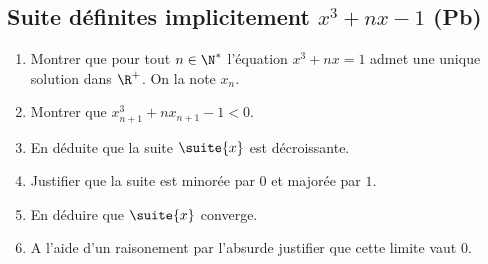 
\subsection{ Suite définites implicitement $x^3+nx-1$ (Pb) }


\begin{exercice}
\begin{enumerate}
\item Montrer que pour tout $n\in \N^*$ l'équation $x^3+nx=1$ admet une unique solution dans $\R^+$. On la note $x_n$. 
\item Montrer que $x_{n+1}^3+n x_{n+1}-1<0$.
\item En déduite que la suite $\suite{x} $ est décroissante. 
\item Justifier que la suite est minorée par $0$ et majorée par $1$. 
\item En déduire que $\suite{x}$ converge. 
\item A l'aide d'un raisonement par l'absurde justifier que cette limite vaut $0$. 
\end{enumerate}
\end{exercice}

